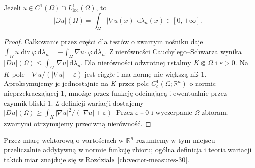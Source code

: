 \begin{lemat}
\label{lem:BV-smooth-29}
Jeżeli $u\in C^1(\Omega)\cap L^1_{\mathrm{loc}}(\Omega)$,
to
\[
 |Du|(\Omega)=\int_\Omega|\nabla u(x)|
 \,\mathrm d\lambda_n(x)\in[0,+\infty].
\]
\end{lemat}
\begin{proof}
Całkowanie przez części dla testów o zwartym nośniku
daje $\int_\Omega u\operatorname{div}\varphi\,\mathrm d\lambda_n=-\int_\Omega\nabla u\cdot\varphi\,\mathrm d\lambda_n$.
Z nierówności Cauchy'ego--Schwarza wynika
$|Du|(\Omega)\le\int_\Omega|\nabla u|\,\mathrm d\lambda_n$.
Dla nierówności odwrotnej ustalmy $K\Subset\Omega$
i $\varepsilon>0$. Na $K$ pole
$-\nabla u/(|\nabla u|+\varepsilon)$ jest ciągłe i ma normę
nie większą niż $1$. Aproksymujemy je jednostajnie na
$K$ przez pole $C_c^1(\Omega;\mathbb R^n)$ o normie
nieprzekraczającej $1$, mnożąc przez funkcję odcinającą
i ewentualnie przez czynnik bliski $1$.
Z definicji wariacji dostajemy
$|Du|(\Omega)\ge\int_K|\nabla u|^2/(|\nabla u|+\varepsilon)$.
Przez $\varepsilon\downarrow0$ i wyczerpanie $\Omega$
zbiorami zwartymi otrzymujemy przeciwną nierówność.
\end{proof}

Przez miarę wektorową o wartościach w $\mathbb R^n$
rozumiemy w tym miejscu przeliczalnie addytywną
w normie funkcję zbioru; ogólna definicja i teoria
wariacji takich miar znajduje się w
Rozdziale~\ref{ch:vector-measures-30}.

